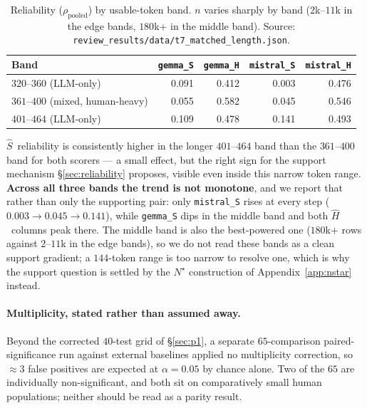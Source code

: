\documentclass{article}
\newcommand{\Sest}{\ensuremath{\widehat{S}}}
\newcommand{\Hest}{\ensuremath{\widehat{H}}}
\begin{document}
\begin{table}[h]
\centering
\footnotesize
\caption{Reliability ($\rho_{\text{pooled}}$) by usable-token band. $n$ varies
sharply by band ($2$k--$11$k in the edge bands, $180$k+ in the middle band).
Source: \texttt{review\_results/data/t7\_matched\_length.json}.}
\label{tab:matchedlength}
\begin{tabular}{lrrrr}
\toprule
Band & \texttt{gemma\_S} & \texttt{gemma\_H} & \texttt{mistral\_S} & \texttt{mistral\_H} \\
\midrule
$320$--$360$ (LLM-only)          & 0.091 & 0.412 & 0.003 & 0.476 \\
$361$--$400$ (mixed, human-heavy) & 0.055 & 0.582 & 0.045 & 0.546 \\
$401$--$464$ (LLM-only)          & 0.109 & 0.478 & 0.141 & 0.493 \\
\bottomrule
\end{tabular}
\end{table}

\Sest\ reliability is consistently higher in the longer $401$--$464$ band than
the $361$--$400$ band for both scorers --- a small effect, but the right sign
for the support mechanism \S\ref{sec:reliability} proposes, visible even inside
this narrow token range. \textbf{Across all three bands the trend is not
monotone}, and we report that rather than only the supporting pair: only
\texttt{mistral\_S} rises at every step ($0.003\to0.045\to0.141$), while
\texttt{gemma\_S} dips in the middle band and both \Hest\ columns peak there.
The middle band is also the best-powered one ($180$k$+$ rows against $2$--$11$k
in the edge bands), so we do not read these bands as a clean support gradient;
a $144$-token range is too narrow to resolve one, which is why the support
question is settled by the $N^{\star}$ construction of
Appendix~\ref{app:nstar} instead.

\paragraph{Multiplicity, stated rather than assumed away.} Beyond the corrected
$40$-test grid of \S\ref{sec:p1}, a separate $65$-comparison paired-significance
run against external baselines applied no multiplicity correction, so
$\approx3$ false positives are expected at $\alpha=0.05$ by chance alone. Two of
the $65$ are individually non-significant, and both sit on comparatively small
human populations; neither should be read as a parity result.
\end{document}
